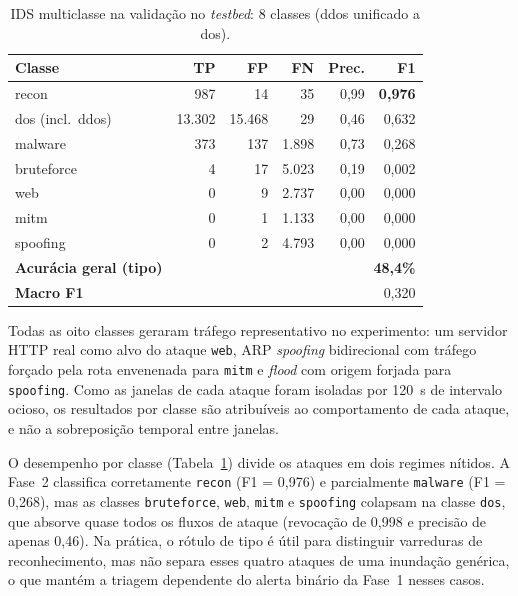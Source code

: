 \documentclass[12pt]{article}
\begin{document}
\begin{table}[ht]
\centering
\caption{IDS multiclasse na validação no \textit{testbed}: 8 classes (ddos unificado a dos).}
\label{tab:multi_metrics}
\begin{tabular}{@{}lrrrrr@{}}
\toprule
\textbf{Classe} & \textbf{TP} & \textbf{FP} & \textbf{FN} & \textbf{Prec.} & \textbf{F1} \\ \midrule
recon             &    987 &     14 &     35 & 0,99 & \textbf{0,976} \\
dos (incl.\ ddos) & 13.302 & 15.468 &     29 & 0,46 & 0,632 \\
malware           &    373 &    137 &  1.898 & 0,73 & 0,268 \\
bruteforce        &      4 &     17 &  5.023 & 0,19 & 0,002 \\
web               &      0 &      9 &  2.737 & 0,00 & 0,000 \\
mitm              &      0 &      1 &  1.133 & 0,00 & 0,000 \\
spoofing          &      0 &      2 &  4.793 & 0,00 & 0,000 \\ \midrule
\textbf{Acurácia geral (tipo)} & \multicolumn{5}{r}{\textbf{48,4\%}} \\
\textbf{Macro F1} & \multicolumn{5}{r}{0,320} \\
\bottomrule
\end{tabular}
\end{table}

Todas as oito classes geraram tráfego representativo no experimento: um servidor
HTTP real como alvo do ataque \texttt{web}, ARP \textit{spoofing} bidirecional
com tráfego forçado pela rota envenenada para \texttt{mitm} e \textit{flood} com
origem forjada para \texttt{spoofing}. Como as janelas de cada ataque foram
isoladas por 120~s de intervalo ocioso, os resultados por classe são
atribuíveis ao comportamento de cada ataque, e não a sobreposição temporal entre
janelas.

O desempenho por classe (Tabela~\ref{tab:multi_metrics}) divide os ataques em
dois regimes nítidos. A Fase~2 classifica corretamente \texttt{recon}
(F1 = 0,976) e parcialmente \texttt{malware} (F1 = 0,268), mas as classes
\texttt{bruteforce}, \texttt{web}, \texttt{mitm} e \texttt{spoofing} colapsam na
classe \texttt{dos}, que absorve quase todos os fluxos de ataque (revocação de
0,998 e precisão de apenas 0,46). Na prática, o rótulo de tipo é útil para
distinguir varreduras de reconhecimento, mas não separa esses quatro ataques de
uma inundação genérica, o que mantém a triagem dependente do alerta binário da
Fase~1 nesses casos.
\end{document}

